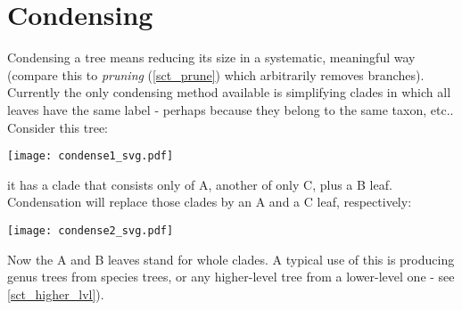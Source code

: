 \section{Condensing}
\label{sct_condense}

Condensing a tree means reducing its size in a systematic, meaningful way
(compare this to \emph{pruning} (\ref{sct_prune}) which arbitrarily removes
branches). Currently the only condensing method available is simplifying
clades in which all leaves have the same label - perhaps because they belong
to the same taxon, etc.. Consider this tree:

\texttt{[image: condense1\_svg.pdf]}

it has a clade that consists only of A, another of only C, plus a B leaf.
Condensation will replace those clades by an A and a C leaf, respectively:


\texttt{[image: condense2\_svg.pdf]}

Now the A and B leaves stand for whole clades.  A typical use of this is
producing genus trees from species trees, or any higher-level tree from a
lower-level one - see \ref{sct_higher_lvl}).
